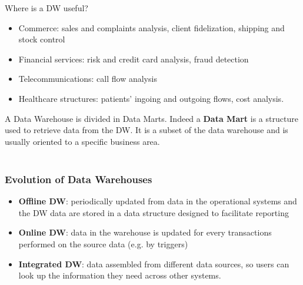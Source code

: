 \documentclass[10pt,a4paper]{article}
\newcommand{\nline}{\\~\\}
\begin{document}
Where is a DW useful?
\begin{itemize}
	\item Commerce: sales and complaints analysis, client fidelization, shipping and stock control
	\item Financial services: risk and credit card analysis, fraud detection
	\item Telecommunications: call flow analysis
	\item Healthcare structures: patients’ ingoing and outgoing flows, cost analysis.
\end{itemize}
A Data Warehouse is divided in Data Marts. Indeed a \textbf{Data Mart} is a structure used to retrieve data from the DW. It is a subset of the data warehouse and is usually oriented to a specific business area. \nline
\subsubsection{Evolution of Data Warehouses}
\begin{itemize}
	\item \textbf{Offline DW}: periodically updated from data in the operational systems and the DW data are stored in a data structure designed to facilitate reporting
	\item \textbf{Online DW}: data in the warehouse is updated for every transactions performed on the source data (e.g. by triggers)
	\item \textbf{Integrated DW}: data assembled from different data sources, so users can look up the information they need across other systems.
\end{itemize}
\end{document}
